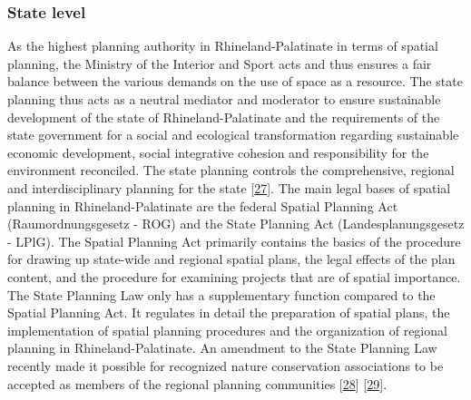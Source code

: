 \documentclass[a4paper,11pt]{article}
\begin{document}
\hypertarget{state-level}{%
\subsubsection{State level}\label{state-level}}

As the highest planning authority in Rhineland-Palatinate in terms of spatial planning, the Ministry of the Interior and Sport acts and thus ensures a fair balance between the various demands on the use of space as a resource. The state planning thus acts as a neutral mediator and moderator to ensure sustainable development of the state of Rhineland-Palatinate and the requirements of the state government for a social and ecological transformation regarding sustainable economic development, social integrative cohesion and responsibility for the environment reconciled. The state planning controls the comprehensive, regional and interdisciplinary planning for the state {[}\protect\hyperlink{ref-MinisteriumdesInnernundfurSport.2021}{27}{]}. The main legal bases of spatial planning in Rhineland-Palatinate are the federal Spatial Planning Act (Raumordnungsgesetz - ROG) and the State Planning Act (Landesplanungsgesetz - LPlG). The Spatial Planning Act primarily contains the basics of the procedure for drawing up state-wide and regional spatial plans, the legal effects of the plan content, and the procedure for examining projects that are of spatial importance. The State Planning Law only has a supplementary function compared to the Spatial Planning Act. It regulates in detail the preparation of spatial plans, the implementation of spatial planning procedures and the organization of regional planning in Rhineland-Palatinate. An amendment to the State Planning Law recently made it possible for recognized nature conservation associations to be accepted as members of the regional planning communities {[}\protect\hyperlink{ref-BundesministeriumderJustizundfurVerbraucherschutz.2008}{28}{]} {[}\protect\hyperlink{ref-MinisteriumderJustizRheinlandPfalz.2003}{29}{]}.
\end{document}
